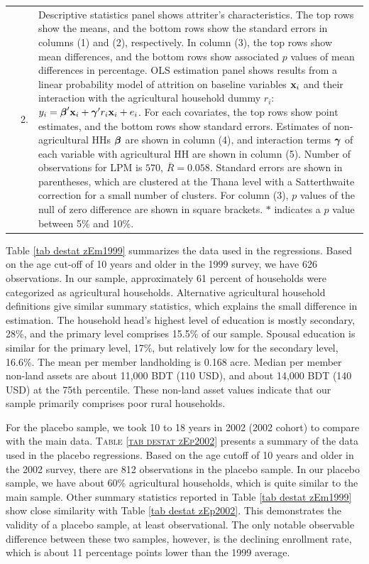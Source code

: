 \documentclass[12pt,letterpaper]{article}
\newcommand{\bfbeta}{\ensuremath{\mbox{\boldmath $\beta$}}}
\newcommand{\bfgamma}{\ensuremath{\mbox{\boldmath $\gamma$}}}
\newcommand{\bfx}{\ensuremath{\mbox{\bf x}}}
\newcommand{\0}{\ensuremath{\mbox{\boldmath $0$}}}
\begin{document}
\begin{table}[bp]
\begin{minipage}[t]{14cm}
\begin{tabular}{>{\hfill\scriptsize}p{1cm}<{}>{\hfill\scriptsize}p{.25cm}<{}>{\scriptsize}p{13.75cm}<{\hfill}}
& 2. & \textsf{Descriptive statistics} panel shows attriter's characteristics. The top rows show the means, and the bottom rows show the standard errors in columns (1) and (2), respectively. In column (3), the top rows show mean differences, and the bottom rows show associated $p$ values of mean differences in percentage. \textsf{OLS estimation} panel shows results from a linear probability model of attrition on baseline variables $\bfx_{i}$ and their interaction with the agricultural household dummy $r_{i}$: $y_{i}=\bfbeta'\bfx_{i}+\bfgamma'r_{i}\bfx_{i}+e_{i}$. For each covariates, the top rows show point estimates, and the bottom rows show standard errors. Estimates of non-agricultural HHs $\bfbeta$ are shown in column (4), and interaction terms $\bfgamma$ of each variable with agricultural HH are shown in column (5). Number of observations for LPM is $570$, $\bar{R}=0.058$. Standard errors are shown in parentheses, which are clustered at the Thana level with a Satterthwaite correction for a small number of clusters. For column (3), $p$ values of the null of zero difference are shown in square brackets. $*$ indicates a $p$ value between 5\% and 10\%. 
\end{tabular}
\end{minipage}
\end{table}

Table \ref{tab destat zEm1999} summarizes the data used in the regressions. Based on the age cut-off of 10 years and older in the 1999 survey, we have 626 observations. In our sample, approximately 61 percent of households were categorized as agricultural households. Alternative agricultural household definitions give similar summary statistics, which explains the small difference in estimation. The household head's highest level of education is mostly secondary, 28\%, and the primary level comprises 15.5\% of our sample. Spousal education is similar for the primary level, 17\%, but relatively low for the secondary level, 16.6\%. The mean per member landholding is 0.168 acre. Median per member non-land assets are about 11,000 BDT (110 USD), and about 14,000 BDT (140 USD) at the 75th percentile. These non-land asset values indicate that our sample primarily comprises poor rural households.

For the placebo sample, we took 10 to 18 years in 2002 (2002 cohort) to compare with the main data. \textsc{Table \ref{tab destat zEp2002}} presents a summary of the data used in the placebo regressions. Based on the age cutoff of 10 years and older in the 2002 survey, there are 812 observations in the placebo sample. In our placebo sample, we have about 60\% agricultural households, which is quite similar to the main sample. Other summary statistics reported in Table \ref{tab destat zEm1999} show close similarity with Table \ref{tab destat zEp2002}. This demonstrates the validity of a placebo sample, at least observational. The only notable observable difference between these two samples, however, is the declining enrollment rate, which is about 11 percentage points lower than the 1999 average.
\end{document}
